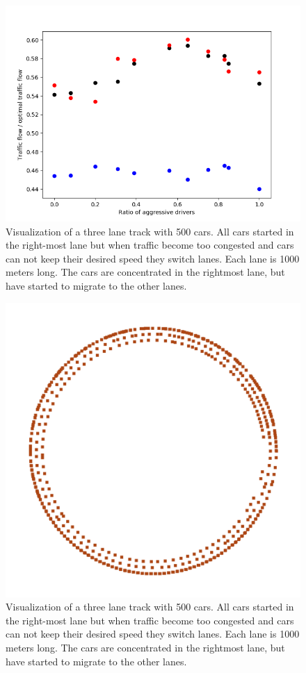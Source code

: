 \documentclass[12pt,a4paper]{article}
\begin{document}
\begin{figure}[h]
    \centering
    \includegraphics[scale=0.3]{figs/jam_flow_aggresives_150.png}
    \caption{Visualization of a three lane track with 500 cars. All cars started in the right-most lane but when traffic become too congested and cars can not keep their desired speed they switch lanes. Each lane is 1000 meters long. The cars are concentrated in the rightmost lane, but have started to migrate to the other lanes.}
    \label{fig:jam_flow}
\end{figure}

\begin{figure}[h]
    \centering
    \includegraphics[scale=0.3]{figs/circular_three_lane.png}
    \caption{Visualization of a three lane track with 500 cars. All cars started in the right-most lane but when traffic become too congested and cars can not keep their desired speed they switch lanes. Each lane is 1000 meters long. The cars are concentrated in the rightmost lane, but have started to migrate to the other lanes.}
    \label{fig:a3lanes}
\end{figure}
\end{document}
